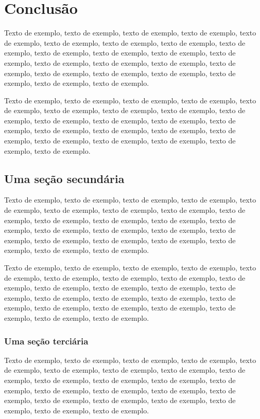 \documentclass[
	12pt,				%
	oneside,			%
	a4paper,			%
	english,			%
	brazil				%
	]{abntex2ppgsi}
\begin{document}
\chapter{Conclusão}

Texto de exemplo, texto de exemplo, texto de exemplo, texto de exemplo, texto de exemplo, texto de exemplo, texto de exemplo, texto de exemplo, texto de exemplo, texto de exemplo, texto de exemplo, texto de exemplo, texto de exemplo, texto de exemplo, texto de exemplo, texto de exemplo, texto de exemplo, texto de exemplo, texto de exemplo, texto de exemplo, texto de exemplo, texto de exemplo, texto de exemplo.

Texto de exemplo, texto de exemplo, texto de exemplo, texto de exemplo, texto de exemplo, texto de exemplo, texto de exemplo, texto de exemplo, texto de exemplo, texto de exemplo, texto de exemplo, texto de exemplo, texto de exemplo, texto de exemplo, texto de exemplo, texto de exemplo, texto de exemplo, texto de exemplo, texto de exemplo, texto de exemplo, texto de exemplo, texto de exemplo.

\section{Uma seção secundária}

Texto de exemplo, texto de exemplo, texto de exemplo, texto de exemplo, texto de exemplo, texto de exemplo, texto de exemplo, texto de exemplo, texto de exemplo, texto de exemplo, texto de exemplo, texto de exemplo, texto de exemplo, texto de exemplo, texto de exemplo, texto de exemplo, texto de exemplo, texto de exemplo, texto de exemplo, texto de exemplo, texto de exemplo, texto de exemplo, texto de exemplo.

Texto de exemplo, texto de exemplo, texto de exemplo, texto de exemplo, texto de exemplo, texto de exemplo, texto de exemplo, texto de exemplo, texto de exemplo, texto de exemplo, texto de exemplo, texto de exemplo, texto de exemplo, texto de exemplo, texto de exemplo, texto de exemplo, texto de exemplo, texto de exemplo, texto de exemplo, texto de exemplo, texto de exemplo, texto de exemplo, texto de exemplo.

\subsection{Uma seção terciária}

Texto de exemplo, texto de exemplo, texto de exemplo, texto de exemplo, texto de exemplo, texto de exemplo, texto de exemplo, texto de exemplo, texto de exemplo, texto de exemplo, texto de exemplo, texto de exemplo, texto de exemplo, texto de exemplo, texto de exemplo, texto de exemplo, texto de exemplo, texto de exemplo, texto de exemplo, texto de exemplo, texto de exemplo, texto de exemplo, texto de exemplo.
\end{document}
